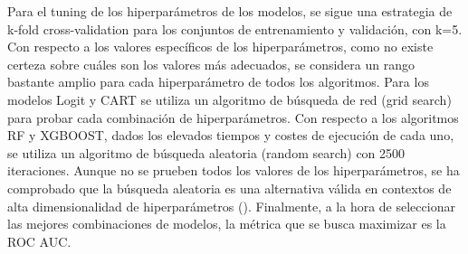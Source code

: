 Para el tuning de los hiperparámetros de los modelos, se sigue una estrategia de k-fold cross-validation para los conjuntos de entrenamiento y validación, con k=5. Con respecto a los valores específicos de los hiperparámetros, como no existe certeza sobre cuáles son los valores más adecuados, se considera un rango bastante amplio para cada hiperparámetro de todos los algoritmos. Para los modelos Logit y CART se utiliza un algoritmo de búsqueda de red (grid search) para probar cada combinación de hiperparámetros. Con respecto a los algoritmos RF y XGBOOST, dados los elevados tiempos y costes de ejecución de cada uno, se utiliza un algoritmo de búsqueda aleatoria (random search) con 2500 iteraciones. Aunque no se prueben todos los valores de los hiperparámetros, se ha comprobado que la búsqueda aleatoria es una alternativa válida en contextos de alta dimensionalidad de hiperparámetros (\cite{bergstra2012random}). Finalmente, a la hora de seleccionar las mejores combinaciones de modelos, la métrica que se busca maximizar es la ROC AUC.